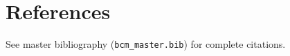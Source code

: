 \section{References}
\label{sec:hrc-references}

See master bibliography (\texttt{bcm\_master.bib}) for complete citations.

\nocite{bcm_master}

